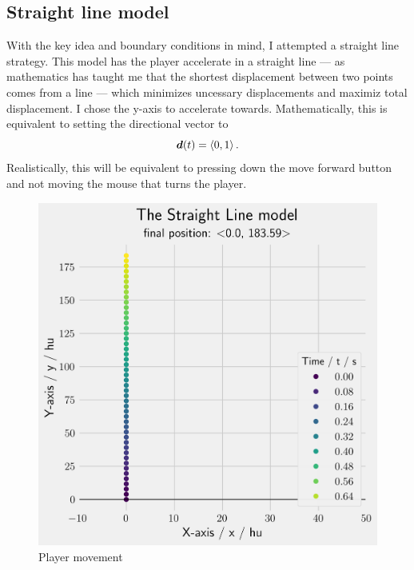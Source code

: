\subsection{Straight line model}
With the key idea and boundary conditions in mind, I attempted a straight line strategy. This model has the player accelerate in a straight line --- as mathematics has taught me that the shortest displacement between two points comes from a line --- which minimizes uncessary displacements and maximiz total displacement. I chose the y-axis to accelerate towards. Mathematically, this is equivalent to setting the directional vector to
\[
    \boldsymbol{d}(t) = \left\langle 0, 1 \right\rangle.
\]
Realistically, this will be equivalent to pressing down the move forward button and not moving the mouse that turns the player.
\begin{figure}[H]
    \centering
     \begin{minipage}{.5\textwidth}
        \centering
        \includegraphics[width=0.9\linewidth]{assets/straight_constraint.png}
        \caption{Player movement}
        \label{fig:straight_constraint}
    \end{minipage}%
    \begin{minipage}{.5\textwidth}
        \centering

\end{minipage}
\end{figure}
